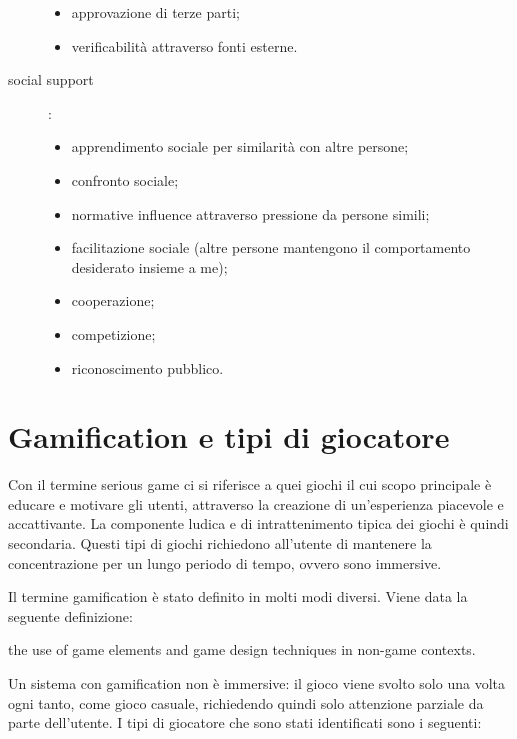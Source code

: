 \begin{description}
\begin{itemize}
        \item approvazione di terze parti;
        \item verificabilità attraverso fonti esterne.
    \end{itemize}
    \item[social support]:
    \begin{itemize}
        \item apprendimento sociale per similarità con altre persone;
        \item confronto sociale;
        \item normative influence attraverso pressione da persone simili;
        \item facilitazione sociale (altre persone mantengono il comportamento desiderato insieme a me);
        \item cooperazione;
        \item competizione;
        \item riconoscimento pubblico.
    \end{itemize} 
\end{description}

\section{Gamification e tipi di giocatore\label{sec:gamification-giocatore}}

Con il termine serious game ci si riferisce a quei giochi il cui scopo principale è educare e motivare gli utenti, attraverso la creazione di un'esperienza piacevole e accattivante. La componente ludica e di intrattenimento tipica dei giochi è quindi secondaria.
Questi tipi di giochi richiedono all'utente di mantenere la concentrazione per un lungo periodo di tempo, ovvero sono immersive.

Il termine gamification è stato definito in molti modi diversi. Viene data la seguente definizione:
\begin{quoting}
    \omissis the use of game elements and game design techniques in non-game contexts. \omissis
\end{quoting}

Un sistema con gamification non è immersive: il gioco viene svolto solo una volta ogni tanto, come gioco casuale, richiedendo quindi solo attenzione parziale da parte dell'utente.
I tipi di giocatore che sono stati identificati sono i seguenti:

